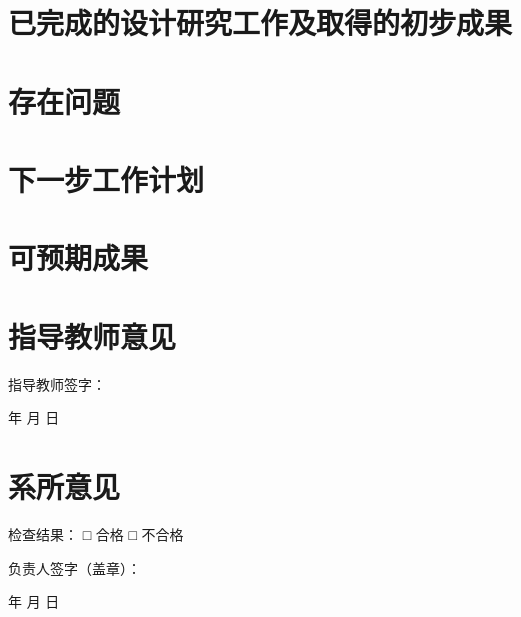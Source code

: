 ﻿\chapter{已完成的设计研究工作及取得的初步成果}

\chapter{存在问题}


\chapter{下一步工作计划}

\chapter{可预期成果}



\chapter*{指导教师意见}

指导教师签字：

                                              年    月    日
\chapter*{系所意见}
检查结果：       □ 合格            □ 不合格



负责人签字（盖章）：

年    月    日

